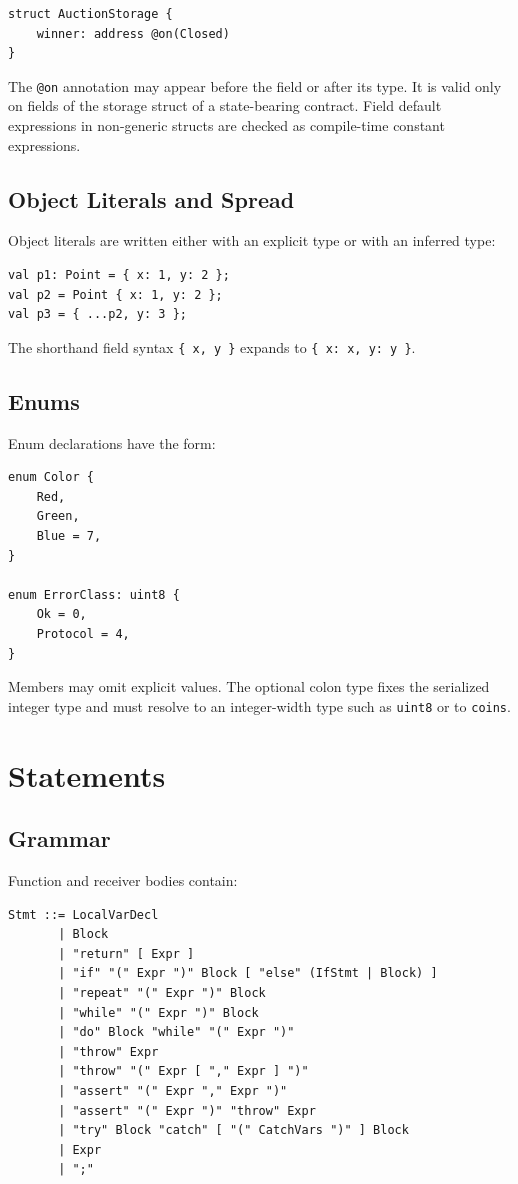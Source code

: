 \documentclass[12pt,oneside]{article}
\begin{document}
\begin{verbatim}
struct AuctionStorage {
    winner: address @on(Closed)
}
\end{verbatim}

The \verb|@on| annotation may appear before the field or after its type. It is
valid only on fields of the storage struct of a state-bearing contract. Field
default expressions in non-generic structs are checked as compile-time
constant expressions.

\subsection{Object Literals and Spread}
Object literals are written either with an explicit type or with an inferred
type:

\begin{verbatim}
val p1: Point = { x: 1, y: 2 };
val p2 = Point { x: 1, y: 2 };
val p3 = { ...p2, y: 3 };
\end{verbatim}

The shorthand field syntax \verb|{ x, y }| expands to
\verb|{ x: x, y: y }|.

\subsection{Enums}
Enum declarations have the form:

\begin{verbatim}
enum Color {
    Red,
    Green,
    Blue = 7,
}

enum ErrorClass: uint8 {
    Ok = 0,
    Protocol = 4,
}
\end{verbatim}

Members may omit explicit values. The optional colon type fixes the serialized
integer type and must resolve to an integer-width type such as \verb|uint8| or
to \verb|coins|.

\section{Statements}
\label{sec:statements}
\subsection{Grammar}
Function and receiver bodies contain:

\begin{verbatim}
Stmt ::= LocalVarDecl
       | Block
       | "return" [ Expr ]
       | "if" "(" Expr ")" Block [ "else" (IfStmt | Block) ]
       | "repeat" "(" Expr ")" Block
       | "while" "(" Expr ")" Block
       | "do" Block "while" "(" Expr ")"
       | "throw" Expr
       | "throw" "(" Expr [ "," Expr ] ")"
       | "assert" "(" Expr "," Expr ")"
       | "assert" "(" Expr ")" "throw" Expr
       | "try" Block "catch" [ "(" CatchVars ")" ] Block
       | Expr
       | ";"
\end{verbatim}
\end{document}
